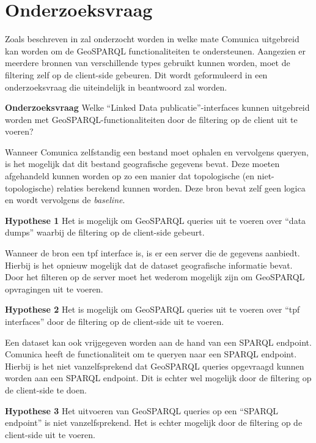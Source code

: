 \section{Onderzoeksvraag}
\label{sec:onderzoeksvraag}
Zoals beschreven in  zal onderzocht worden in welke mate Comunica uitgebreid kan worden om de GeoSPARQL functionaliteiten te ondersteunen. Aangezien er meerdere bronnen van verschillende types gebruikt kunnen worden, moet de filtering zelf op de client-side gebeuren. Dit wordt geformuleerd in een onderzoeksvraag die uiteindelijk in  beantwoord zal worden. 

\textbf{Onderzoeksvraag} Welke ``Linked Data publicatie''-interfaces kunnen uitgebreid worden met GeoSPARQL-functionaliteiten door de filtering op de client uit te voeren?

Wanneer Comunica zelfstandig een bestand moet ophalen en vervolgens queryen, is het mogelijk dat dit bestand geografische gegevens bevat. Deze moeten afgehandeld kunnen worden op zo een manier dat topologische (en niet-topologische) relaties berekend kunnen worden. Deze bron bevat zelf geen logica en wordt vervolgens de \textit{baseline}.

\textbf{Hypothese 1} Het is mogelijk om GeoSPARQL queries uit te voeren over ``data dumps'' waarbij de filtering op de client-side gebeurt.

Wanneer de bron een \acrfull{tpf} interface is, is er een server die de gegevens aanbiedt. Hierbij is het opnieuw mogelijk dat de dataset geografische informatie bevat. Door het filteren op de server moet het wederom mogelijk zijn om GeoSPARQL opvragingen uit te voeren.

\textbf{Hypothese 2} Het is mogelijk om GeoSPARQL queries uit te voeren over ``\acrshort{tpf} interfaces'' door de filtering op de client-side uit te voeren.

Een dataset kan ook vrijgegeven worden aan de hand van een SPARQL endpoint. Comunica heeft de functionaliteit om te queryen naar een SPARQL endpoint. Hierbij is het niet vanzelfsprekend dat GeoSPARQL queries opgevraagd kunnen worden aan een SPARQL endpoint. Dit is echter wel mogelijk door de filtering op de client-side te doen.

\textbf{Hypothese 3} Het uitvoeren van GeoSPARQL queries op een ``SPARQL endpoint'' is niet vanzelfsprekend. Het is echter mogelijk door de filtering op de client-side uit te voeren.